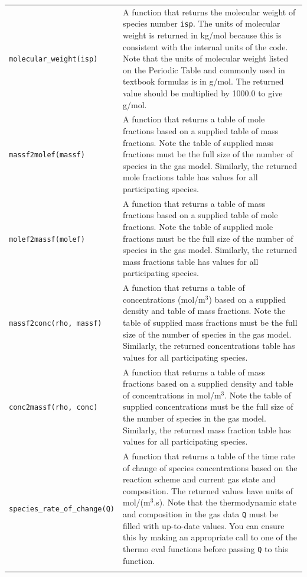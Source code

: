 \begin{tabular}{p{5cm}p{9cm}} 
 \noalign{\smallskip} \hline \noalign{\smallskip}
\texttt{molecular\_weight(isp)} & A function that returns
the molecular weight of species number \texttt{isp}. The
units of molecular weight is returned in kg/mol because this
is consistent with the internal units of the code. Note that
the units of molecular weight listed on the Periodic Table
and commonly used in textbook formulas is in g/mol. The returned
value should be multiplied by 1000.0 to give g/mol. \\
\texttt{massf2molef(massf)} & A function that returns a table
of mole fractions based on a supplied table of mass fractions.
Note the table of supplied mass fractions must be the full size
of the number of species in the gas model. Similarly, the returned
mole fractions table has values for all participating species. \\
\texttt{molef2massf(molef)} & A function that returns a table
of mass fractions based on a supplied table of mole fractions.
Note the table of supplied mole fractions must be the full size
of the number of species in the gas model. Similarly, the returned
mass fractions table has values for all participating species. \\
\texttt{massf2conc(rho, massf)} & A function that returns a table
of concentrations (mol/m$^3$) based on a supplied density and
table of mass fractions.
Note the table of supplied mass fractions must be the full size
of the number of species in the gas model. Similarly, the returned
concentrations table has values for all participating species. \\
\texttt{conc2massf(rho, conc)} & A function that returns a table
of mass fractions based on a supplied density and table of concentrations
in mol/m$^3$.
Note the table of supplied concentrations must be the full size
of the number of species in the gas model. Similarly, the returned
mass fraction table has values for all participating species. \\
\texttt{species\_rate\_of\_change(Q)} & A function that returns
a table of the time rate of change of species concentrations
based on the reaction scheme and current gas state and composition.
The returned values have units of mol/(m$^3$.s).
Note that the thermodynamic state and composition in the
gas data \texttt{Q} must be filled with up-to-date values.
You can ensure this by making an appropriate call to one
of the thermo eval functions before passing \texttt{Q}
to this function. \\
\noalign{\smallskip} \hline \noalign{\smallskip}
\end{tabular}

